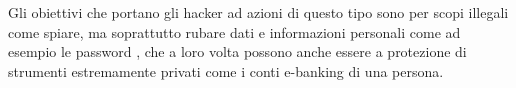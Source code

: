 Gli obiettivi che portano gli hacker ad azioni di questo tipo sono per scopi illegali come spiare, ma soprattutto rubare dati e informazioni personali come ad esempio le password , che a loro volta possono anche essere a protezione di strumenti estremamente privati come i conti e-banking di una persona.